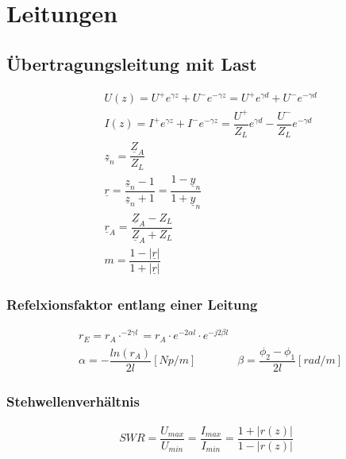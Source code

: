 \section{Leitungen}
\subsection{Übertragungsleitung mit Last}
\begin{align*}
     & U(z) = U^+ e^{\gamma z} + U^- e^{-\gamma z} = U^+ e^{\gamma d} + U^ - e^{-\gamma d}                        \\
     & I(z) = I^+ e^{\gamma z} + I^- e^{-\gamma z} = \dfrac{U^+}{Z_L}e^{\gamma d} - \dfrac{U^-}{Z_L}e^{-\gamma d} \\
     & \underline{z}_n = \dfrac{\underline{Z}_A}{Z_L}                                                             \\
     & \underline{r} = \dfrac{\underline{z}_n-1}{\underline{z}_n+1}= \dfrac{1-\underline{y}_n}{1+\underline{y}_n} \\
     & \underline{r}_A = \dfrac{\underline{Z}_A-Z_L}{\underline{Z}_A+Z_L}                                         \\
     & m = \dfrac{1-|\underline{r}|}{1+|\underline{r}|}
\end{align*}
\subsubsection{Refelxionsfaktor entlang einer Leitung}
\begin{align*}
    &r_E = r_A \cdot ^{-2\gamma l} = r_A \cdot e^{-2\alpha l}\cdot e^{-j2\beta l}\\
    &\alpha = -\dfrac{ln(r_A)}{2l} [Np/m]
    &\beta = \dfrac{\phi_2 -\phi_1}{2l} [rad/m]
\end{align*}

\subsubsection{Stehwellenverhältnis}
\begin{align*}
    SWR = \dfrac{U_{max}}{U_{min}} = \dfrac{I_{max}}{I_{min}} = \dfrac{1+|r(z)|}{1-|r(z)|}
\end{align*}
